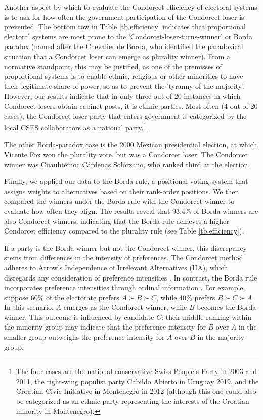 \documentclass[12pt]{scrartcl}
\begin{document}
Another aspect by which to evaluate the Condorcet efficiency of electoral systems is to ask for how often the government participation of the Condorcet loser is prevented. The bottom row in Table \ref{tb.efficiency} indicates that proportional electoral systems are most prone to the 'Condorcet-loser-turns-winner' \citep{vanDeemen1993} or Borda paradox (named after the Chevalier de Borda, who identified the paradoxical situation that a Condorcet loser can emerge as plurality winner). From a normative standpoint, this may be justified, as one of the premisses of proportional systems is to enable ethnic, religious or other minorities to have their legitimate share of power, so as to prevent the 'tyranny of the majority'. However, our results indicate that in only three out of 20 instances in which Condorcet losers obtain cabinet posts, it is ethnic parties. Most often (4 out of 20 cases), the Condorcet loser party that enters government is categorized by the local CSES collaborators as a national party.\footnote{The four cases are the national-conservative Swiss People's Party in 2003 and 2011, the right-wing populist party Cabildo Abierto in Uruguay 2019, and the Croatian Civic Initiative in Montenegro in 2012 (although this one could also be categorized as an ethnic party representing the interests of the Croatian minority in Montenegro).} 

The other Borda-paradox case is the 2000 Mexican presidential election, at which Vicente Fox won the plurality vote, but was a Condorcet loser. The Condorcet winner was Cuauht\'{e}moc C\'{a}rdenas Sol\'{o}rzano, who ranked third at the election.

Finally, we applied our data to the Borda rule, a positional voting system that assigns weights to alternatives based on their rank-order positions. We then compared the winners under the Borda rule with the Condorcet winner to evaluate how often they align. The results reveal that 93.4\% of Borda winners are also Condorcet winners, indicating that the Borda rule achieves a higher Condorcet efficiency compared to the plurality rule (see Table \ref{tb.efficiency}).

If a party is the Borda winner but not the Condorcet winner, this discrepancy stems from differences in the intensity of preferences. The Condorcet method adheres to Arrow's Independence of Irrelevant Alternatives (IIA), which disregards any consideration of preference intensities \citep[Ch.~7]{Sen2017}. In contrast, the Borda rule incorporates preference intensities through ordinal information \citep{Maskin2024}. For example, suppose 60\% of the electorate prefers $A \succ B \succ C$, while 40\% prefers $B \succ C \succ A$. In this scenario, $A$ emerges as the Condorcet winner, while $B$ becomes the Borda winner. This outcome is influenced by candidate $C$: their middle ranking within the minority group may indicate that the preference intensity for $B$ over $A$ in the smaller group outweighs the preference intensity for $A$ over $B$ in the majority group.
\end{document}
